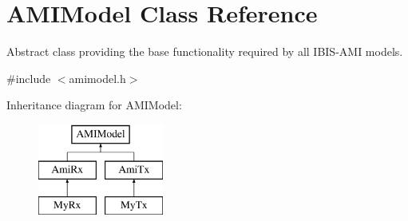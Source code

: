 \hypertarget{class_a_m_i_model}{}\section{A\+M\+I\+Model Class Reference}
\label{class_a_m_i_model}


Abstract class providing the base functionality required by all I\+B\+I\+S-\/\+A\+M\+I models.  




{\ttfamily \#include $<$amimodel.\+h$>$}

Inheritance diagram for A\+M\+I\+Model\+:\begin{figure}[H]
\begin{center}
\leavevmode
\includegraphics[height=3.000000cm]{class_a_m_i_model}
\end{center}
\end{figure}
